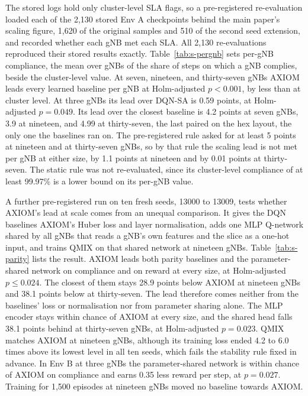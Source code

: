 \documentclass[9pt]{extarticle}
\begin{document}
The stored logs hold only cluster-level SLA flags, so a pre-registered re-evaluation loaded each of the 2{,}130 stored Env A checkpoints behind the main paper's scaling figure, 1{,}620 of the original samples and 510 of the second seed extension, and recorded whether each gNB met each SLA. All 2{,}130 re-evaluations reproduced their stored results exactly. Table~\ref{tab:s-pergnb} sets per-gNB compliance, the mean over gNBs of the share of steps on which a gNB complies, beside the cluster-level value. At seven, nineteen, and thirty-seven gNBs AXIOM leads every learned baseline per gNB at Holm-adjusted $p<0.001$, by less than at cluster level. At three gNBs its lead over DQN-SA is 0.59 points, at Holm-adjusted $p=0.049$. Its lead over the closest baseline is 4.2 points at seven gNBs, 3.9 at nineteen, and 4.99 at thirty-seven, the last paired on the hex layout, the only one the baselines ran on. The pre-registered rule asked for at least 5 points at nineteen and at thirty-seven gNBs, so by that rule the scaling lead is not met per gNB at either size, by 1.1 points at nineteen and by 0.01 points at thirty-seven. The static rule was not re-evaluated, since its cluster-level compliance of at least 99.97\% is a lower bound on its per-gNB value.

A further pre-registered run on ten fresh seeds, 13000 to 13009, tests whether AXIOM's lead at scale comes from an unequal comparison. It gives the DQN baselines AXIOM's Huber loss and layer normalisation, adds one MLP Q-network shared by all gNBs that reads a gNB's own features and the slice as a one-hot input, and trains QMIX on that shared network at nineteen gNBs. Table~\ref{tab:s-parity} lists the result. AXIOM leads both parity baselines and the parameter-shared network on compliance and on reward at every size, at Holm-adjusted $p\leq0.024$. The closest of them stays 28.9 points below AXIOM at nineteen gNBs and 38.1 points below at thirty-seven. The lead therefore comes neither from the baselines' loss or normalisation nor from parameter sharing alone. The MLP encoder stays within chance of AXIOM at every size, and the shared head falls 38.1 points behind at thirty-seven gNBs, at Holm-adjusted $p=0.023$. QMIX matches AXIOM at nineteen gNBs, although its training loss ended 4.2 to 6.0 times above its lowest level in all ten seeds, which fails the stability rule fixed in advance. In Env B at three gNBs the parameter-shared network is within chance of AXIOM on compliance and earns 0.35 less reward per step, at $p=0.027$. Training for 1{,}500 episodes at nineteen gNBs moved no baseline towards AXIOM.
\end{document}
